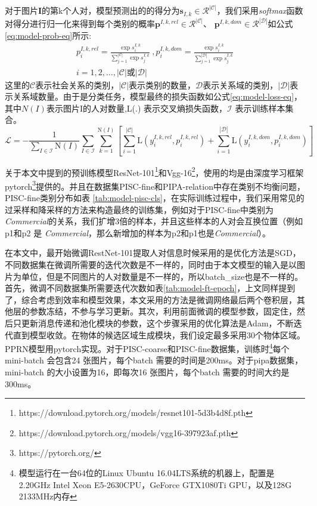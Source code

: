 对于图片\textbf{I}的第k个人对，模型预测出的的得分为$\mathbf{s}_{I,k} \in \mathcal{R}^{|\mathcal{C}|}$，我们采用{\it softmax}函数对得分进行归一化来得到每个类别的概率$\mathbf{p}^{I,k,rel} \in \mathcal{R}^{|\mathcal{C}|}$、
$\mathbf{p}^{I,k,dom} \in \mathcal{R}^{|\mathcal{D}|}$如公式\ref{eq:model-prob-eq}所示:
\begin{equation}
  \label{eq:model-prob-eq}
  \begin{split}
  p_i^{I,k,rel} = \frac{\exp{s_i^{I,k}}}{\sum_{j=1}^{|\mathcal{C}|}{\exp{s_j^{I,k}}}}~, p_i^{I,k,dom} = \frac{\exp{s_i^{I,k}}}{\sum_{j=1}^{|\mathcal{D}|}{\exp{s_j^{I,k}}}} \\
  i=1,2,\dots,|\mathcal{C}|或|\mathcal{D}|
  \end{split}
\end{equation}
这里的$\mathcal{C}$表示社会关系的类别，$|\mathcal{C}|$表示类别的数量，$\mathcal{D}$表示关系域的类别，$|\mathcal{D}|$表示关系域数量。由于是分类任务，模型最终的损失函数如公式\ref{eq:model-loss-eq}，其中$N(I)$表示图片I的人对数量,L(.) 表示交叉熵损失函数，$\mathcal{I}$ 表示训练样本集合。
\begin{equation}
  \label{eq:model-loss-eq}
  \mathcal{L} = - \frac{1}{\sum_{I \in \mathcal{I}}\text{N}(I)} \sum_{I \in \mathcal{I}} \sum_{k=1}^{\text{N}(I)} [ \sum_{i=1}^{|\mathcal{C}|} \text{L}(y_{i}^{I,k,rel}, p_{i}^{I,k,rel}) + \sum_{i=1}^{|\mathcal{D}|}\text{L}(y_{i}^{I,k,dom}, p_{i}^{I,k,dom}) ]
\end{equation}

关于本文中提到的预训练模型ResNet-101\footnote{https://download.pytorch.org/models/resnet101-5d3b4d8f.pth}和Vgg-16\footnote{https://download.pytorch.org/models/vgg16-397923af.pth}，使用的均是由深度学习框架pytorch\footnote{https://pytorch.org/}提供的。并且在数据集PISC-fine和PIPA-relation中存在类别不均衡问题，PISC-fine类别分布如表
\ref{tab:model-pisc-cls}，在实际训练过程中，我们采用常见的过采样和降采样的方法来构造最终的训练集，例如对于PISC-fine中类别为{\it Commercial}的关系，我们扩增3倍的样本，并且这些样本的人对会互换位置（例如p1和p2 是
{\it Commercial}，那么新增加的样本为p2和p1也是{\it Commercial}）。

在本文中，最开始微调RestNet-101提取人对信息时候采用的是优化方法是SGD，不同数据集在微调所需要的迭代次数是不一样的，同时由于本文模型的输入是以图片为单位，但是不同图片的人对数量是不一样的，所以batch\_size也是不一样的。首先，微调不同数据集所需要迭代次数如表\ref{tab:model-ft-epoch}，上文同样提到了，综合考虑到效率和模型效果，本文采用的方法是微调网络最后两个卷积层，其他层的参数冻结，不参与学习更新。其次，利用前面微调的模型参数，固定住，然后只更新消息传递和池化模块的参数，这个步骤采用的优化算法是Adam\cite{kingma2014adam}，不断迭代直到模型收敛。在物体的候选区域生成模块，我们设定最多采用30个物体区域。PPRN模型用pytorch实现。对于PISC-coarse和PISC-fine数据集，训练时\footnote{模型运行在一台64位的Linux Ubuntu 16.04LTS系统的机器上，配置是2.20GHz Intel Xeon E5-2630CPU，GeForce GTX1080Ti GPU，以及128G 2133MHz内存}每个mini-batch 会包含24 张图片，每个batch 需要的时间是200ms。对于pipa数据集，mini-batch 的大小设置为16，即每次16 张图片，每个batch 需要的时间大约是300ms。

